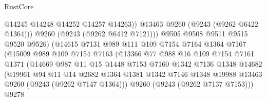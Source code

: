 \begin{lexlean}{RustCore}
\begin{coremodule}
                                    @14245
                                    @14248
                                    @14252
                                    @14257
                                    @14263))
                                @13463
                                @9260
                                (@9243 (@9262 @6422 @1364)))
                              @9260
                              (@9243 (@9262 @6412 @7121)))
                            @9505
                            @9508
                            @9511
                            @9515
                            @9520
                            @9526)
                          (@14615
                            @7131
                            @989
                            @111
                            @109
                            @7154
                            @7164
                            @1364
                            @7167
                            (@15009
                              @989
                              @109
                              @7154
                              @7163
                              (@13366
                                @77
                                @988
                                @16
                                @109
                                @7154
                                @7161
                                @1371
                                (@14669
                                  @987
                                  @11
                                  @15
                                  @1448
                                  @7153
                                  @7160
                                  @1342
                                  @7136
                                  @1348
                                  @14682
                                  (@19961
                                    @94
                                    @11
                                    @14
                                    @2682
                                    @1364
                                    @1381
                                    @1342
                                    @7146
                                    @1348
                                    @19988
                                    @13463
                                    @9260
                                    (@9243 (@9262 @7147 @1364)))
                                  @9260
                                  (@9243 (@9262 @7137 @7153)))
                                @9278

\end{coremodule}
\end{lexlean}
